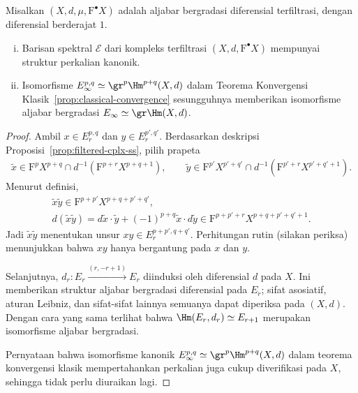 \begin{proposition}\label{prop:dga-mult-ss}
	Misalkan $(X,d,\mu,\mathrm{F}^\bullet X)$ adalah aljabar bergradasi
	diferensial terfiltrasi, dengan diferensial berderajat $1$.
	\begin{enumerate}[(i)]
		\item Barisan spektral $\mathscr{E}$ dari kompleks terfiltrasi
		$(X,d,\mathrm{F}^\bullet X)$ mempunyai struktur perkalian kanonik.
		\item Isomorfisme
		$E_\infty^{p,q}\simeq\gr^p\Hm^{p+q}(X,d)$ dalam Teorema Konvergensi
		Klasik~\ref{prop:classical-convergence} sesungguhnya memberikan
		isomorfisme aljabar bergradasi
		$E_\infty\simeq\gr\Hm(X,d)$.
	\end{enumerate}
\end{proposition}
\begin{proof}
	Ambil $x\in E_r^{p,q}$ dan $y\in E_r^{p',q'}$. Berdasarkan deskripsi
	Proposisi~\ref{prop:filtered-cplx-ss}, pilih prapeta
	\begin{gather*}
		\widetilde{x}\in\mathrm{F}^pX^{p+q}\cap
		d^{-1}\left(\mathrm{F}^{p+r}X^{p+q+1}\right),\qquad
		\widetilde{y}\in\mathrm{F}^{p'}X^{p'+q'}\cap
		d^{-1}\left(\mathrm{F}^{p'+r}X^{p'+q'+1}\right).
	\end{gather*}
	Menurut definisi,
	\begin{gather*}
		\widetilde{x}\widetilde{y}\in
		\mathrm{F}^{p+p'}X^{p+q+p'+q'},\\
		d(\widetilde{x}\widetilde{y})
		=d\widetilde{x}\cdot\widetilde{y}
		+(-1)^{p+q}\widetilde{x}\cdot d\widetilde{y}
		\in\mathrm{F}^{p+p'+r}X^{p+q+p'+q'+1}.
	\end{gather*}
	Jadi $\widetilde{x}\widetilde{y}$ menentukan unsur
	$xy\in E_r^{p+p',q+q'}$. Perhitungan rutin (silakan periksa) menunjukkan
	bahwa $xy$ hanya bergantung pada $x$ dan $y$.

	Selanjutnya, $d_r:E_r\xrightarrow{(r,-r+1)}E_r$ diinduksi oleh diferensial
	$d$ pada $X$. Ini memberikan struktur aljabar bergradasi diferensial pada
	$E_r$; sifat asosiatif, aturan Leibniz, dan sifat-sifat lainnya semuanya
	dapat diperiksa pada $(X,d)$. Dengan cara yang sama terlihat bahwa
	$\Hm(E_r,d_r)\simeq E_{r+1}$ merupakan isomorfisme aljabar bergradasi.

	Pernyataan bahwa isomorfisme kanonik
	$E_\infty^{p,q}\simeq\gr^p\Hm^{p+q}(X,d)$ dalam teorema konvergensi klasik
	mempertahankan perkalian juga cukup diverifikasi pada $X$, sehingga
	tidak perlu diuraikan lagi.
\end{proof}

